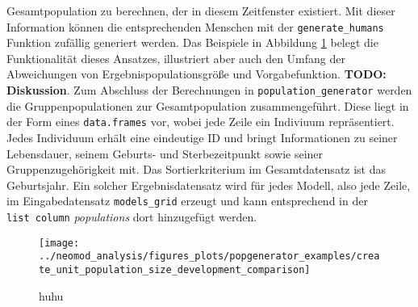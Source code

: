 \documentclass[openany,twoside,twocolumn]{book}
\begin{document}
Gesamtpopulation zu berechnen, der in diesem Zeitfenster existiert. Mit
dieser Information können die entsprechenden Menschen mit der
\texttt{generate\_humans} Funktion zufällig generiert werden. Das
Beispiele in Abbildung \ref{fig:popgen-sizedev-example} belegt die
Funktionalität dieses Ansatzes, illustriert aber auch den Umfang der
Abweichungen von Ergebnispopulationsgröße und Vorgabefunktion.
\textbf{TODO: Diskussion}. Zum Abschluss der Berechnungen in
\texttt{population\_generator} werden die Gruppenpopulationen zur
Gesamtpopulation zusammengeführt. Diese liegt in der Form eines
\texttt{data.frames} vor, wobei jede Zeile ein Indiviuum repräsentiert.
Jedes Individuum erhält eine eindeutige ID und bringt Informationen zu
seiner Lebensdauer, seinem Geburts- und Sterbezeitpunkt sowie seiner
Gruppenzugehörigkeit mit. Das Sortierkriterium im Gesamtdatensatz ist
das Geburtsjahr. Ein solcher Ergebnisdatensatz wird für jedes Modell,
also jede Zeile, im Eingabedatensatz \texttt{models\_grid} erzeugt und
kann entsprechend in der \texttt{list\ column} \emph{populations} dort
hinzugefügt werden.

\begin{figure}
\texttt{[image: ../neomod\_analysis/figures\_plots/popgenerator\_examples/create\_unit\_population\_size\_development\_comparison]} \caption[huhu]{huhu}\label{fig:popgen-sizedev-example}
\end{figure}
\end{document}
